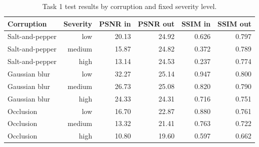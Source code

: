\begin{table}[t]
\centering
\caption{Task 1 test results by corruption and fixed severity level.}
\label{tab:t1_level}
\footnotesize
\begin{tabular}{lrrrrr}
\toprule
Corruption & Severity & PSNR in & PSNR out & SSIM in & SSIM out \\
\midrule
Salt-and-pepper & low & 20.13 & 24.92 & 0.626 & 0.797 \\
Salt-and-pepper & medium & 15.87 & 24.82 & 0.372 & 0.789 \\
Salt-and-pepper & high & 13.14 & 24.53 & 0.237 & 0.774 \\
Gaussian blur & low & 32.27 & 25.14 & 0.947 & 0.800 \\
Gaussian blur & medium & 26.73 & 25.08 & 0.820 & 0.790 \\
Gaussian blur & high & 24.33 & 24.31 & 0.716 & 0.751 \\
Occlusion & low & 16.70 & 22.87 & 0.880 & 0.761 \\
Occlusion & medium & 13.32 & 21.41 & 0.763 & 0.722 \\
Occlusion & high & 10.80 & 19.60 & 0.597 & 0.662 \\
\bottomrule
\end{tabular}
\end{table}
